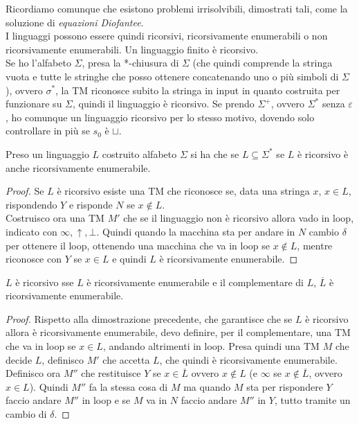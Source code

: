 \documentclass[a4paper,12pt, oneside]{book}
\begin{document}
Ricordiamo comunque che esistono problemi irrisolvibili, dimostrati tali, come la
soluzione di \textit{equazioni Diofantee}.\\
I linguaggi possono essere quindi ricorsivi, ricorsivamente enumerabili o non
ricorsivamente enumerabili. Un linguaggio finito è ricorsivo.\\
Se ho l'alfabeto $\Sigma$, presa la *-chiusura
di $\Sigma$ (che quindi comprende la stringa vuota e tutte le stringhe che
posso ottenere concatenando uno o più simboli di $\Sigma$), ovvero $\sigma^*$,
la TM riconosce subito la stringa in input in quanto costruita per funzionare
su $\Sigma$, quindi il linguaggio è ricorsivo. Se prendo $\Sigma^+$, ovvero
$\Sigma^*$ senza $\varepsilon$, ho comunque un linguaggio ricorsivo per lo
stesso motivo, dovendo solo controllare in più se $s_0$ è $\sqcup$.
\begin{teorema}
  Preso un linguaggio $L$ costruito alfabeto $\Sigma$ si ha che
  se $L\subseteq\Sigma^*$ se $L$ è ricorsivo è anche ricorsivamente
  enumerabile.
  \begin{proof}
    Se $L$ è ricorsivo esiste una TM che riconosce se, data una stringa $x$,
    $x\in L$, rispondendo $Y$ e risponde $N$ se $x\not\in L$.\\
    Costruisco ora una TM $M'$ che se il linguaggio non è ricorsivo allora vado
    in loop, indicato con $\infty,\uparrow,\bot$. Quindi quando la macchina sta
    per andare in $N$ cambio $\delta$ per ottenere il loop, ottenendo una
    macchina che va in loop se $x\not\in L$, mentre riconosce con $Y$ se $x\in
    L$ e quindi $L$ è ricorsivamente enumerabile. 
  \end{proof}
\end{teorema}
\begin{teorema}
  $L$ è ricorsivo sse $L$ è ricorsivamente enumerabile e il complementare di
  $L$, $\overline{L}$ è ricorsivamente enumerabile.
\end{teorema}
\begin{proof}
  Rispetto alla dimostrazione precedente, che garantisce che se $L$ è ricorsivo
  allora è ricorsivamente enumerabile, devo definire, per il complementare, una
  TM che va in loop se $x\in L$, andando altrimenti in loop. Presa quindi una TM
  $M$ che decide $L$, definisco $M'$ che accetta $L$, che quindi è
  ricorsivamente enumerabile. Definisco ora $M''$ che restituisce $Y$ se $x\in
  \overline{L}$ ovvero $x\not\in L$ (e $\infty$ se $x\not\in \overline{L}$,
  ovvero $x\in L$). Quindi $M''$ fa la stessa cosa di $M$ ma quando $M$ sta
  per rispondere $Y$ faccio andare $M''$ in loop e se $M$ va in $N$ faccio
  andare $M''$ in $Y$, tutto tramite un cambio di $\delta$.
\end{proof}
\end{document}
